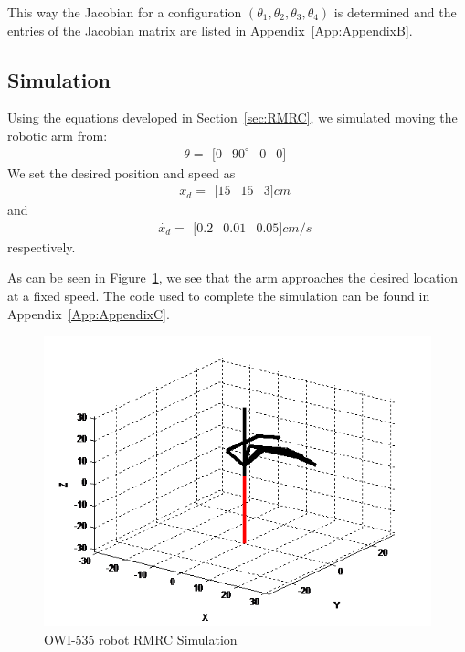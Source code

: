 \documentclass[paper=letter, fontsize=10pt]{scrartcl}	%
\numberwithin{equation}{section}															%
\numberwithin{figure}{section}																%
\numberwithin{table}{section}																%
\begin{document}
This way the Jacobian for a configuration $(\theta_1, \theta_2, \theta_3, \theta_4)$ is determined and the entries of the Jacobian matrix are listed in Appendix~\ref{App:AppendixB}.
\subsection{Simulation}
Using the equations developed in Section~\ref{sec:RMRC}, we simulated moving the robotic arm from:
\[\theta = \begin{matrix}
[0&90^\circ&0&0]
\end{matrix}\]
We set the desired position and speed as
\[x_d = \begin{matrix}
[15&15&3]cm
\end{matrix}\] and
\[\dot{x_d} = \begin{matrix}
[0.2&0.01&0.05]cm/s
\end{matrix}\] respectively.

As can be seen in Figure~\ref{fig:sim}, we see that the arm approaches the desired location at a fixed speed. The code used to complete the simulation can be found in Appendix~\ref{App:AppendixC}.
\begin{figure}[!h]
  \centering
    \includegraphics[width=.75\textwidth]{./Images/sim}
    \caption{OWI-535 robot RMRC Simulation}
    \label{fig:sim}
\end{figure}
\end{document}
